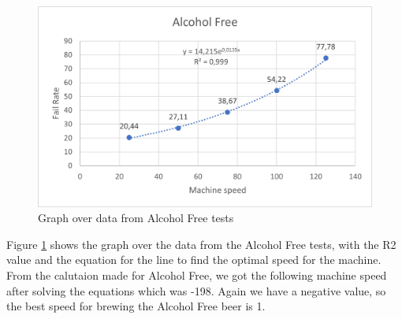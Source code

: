 \begin{center}
    \centering
    \begin{figure}[H]
        \includegraphics[width=1\textwidth]{img/AlcoholFree_graph.png}
        \caption{Graph over data from Alcohol Free tests}
        \label{fig:AlcoholFree_graph}
    \end{figure}
\end{center}

Figure \ref{fig:AlcoholFree_graph} shows the graph over the data from the Alcohol Free tests, with the R2 value and the equation for the line to find the optimal speed for the machine. \newline
From the calutaion made for Alcohol Free, we got the following machine speed after solving the equations which was -198. Again we have a negative value, so the best speed for brewing the Alcohol Free beer is 1. \newline